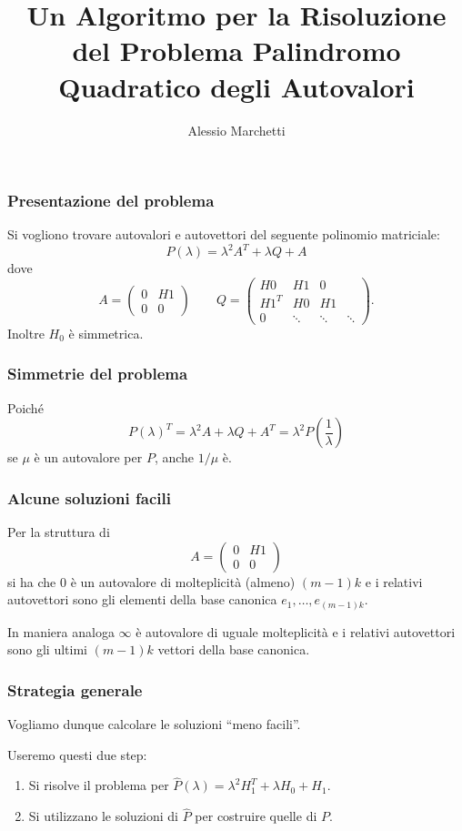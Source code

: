 \documentclass{beamer}
\title[Risoluzione di PQEP]{Un Algoritmo per la Risoluzione del Problema
Palindromo Quadratico degli Autovalori }
\author{Alessio Marchetti}
\date{}
\begin{document}
\frame{\titlepage}

\begin{frame}
\frametitle{Presentazione del problema}
    Si vogliono trovare autovalori e autovettori del seguente polinomio
    matriciale:
    \[
        P(\lambda) = \lambda^2 A^T + \lambda Q + A
    \]
    dove
    \[
        A = 
        \begin{pmatrix}
            0 & H1 \\
            0 & 0
        \end{pmatrix}
        \qquad
        Q = 
        \begin{pmatrix}
            H0 & H1 & 0\\
            H1^T & H0 & H1 \\
            0 & \ddots & \ddots & \ddots 
        \end{pmatrix}.
    \]
    Inoltre $H_0$ \`e simmetrica.
\end{frame}



\begin{frame}
\frametitle{Simmetrie del problema}
    Poich\'e
    \[
        P(\lambda)^T = \lambda^2 A + \lambda Q + A^T = \lambda^2
        P\left(\frac{1}{\lambda}\right)
    \]
    se $\mu$ \`e un autovalore per $P$, anche $1/\mu$ \`e.
\end{frame}


\begin{frame}
\frametitle{Alcune soluzioni facili}
    Per la struttura di
    \[ %
        A = 
        \begin{pmatrix}
            0 & H1 \\
            0 & 0
        \end{pmatrix}
    \]
    si ha che $0$ \`e un autovalore di molteplicit\`a (almeno) $(m-1)k$ e i
    relativi autovettori sono gli elementi della base canonica $e_1, \dots,
    e_{(m-1)k}$.

    In maniera analoga $\infty$ \`e autovalore di uguale molteplicit\`a e i
    relativi autovettori sono gli ultimi $(m-1)k$ vettori della base canonica.
\end{frame}


\begin{frame}
\frametitle{Strategia generale}
    Vogliamo dunque calcolare le soluzioni ``meno facili''.

    Useremo questi due step:
    \begin{enumerate}
        \item Si risolve il problema per $\hat{P}(\lambda) = \lambda^2 H_1^T +
            \lambda H_0 + H_1$.
        \item Si utilizzano le soluzioni di $\hat{P}$ per costruire quelle di
            $P$.
    \end{enumerate}
\end{frame}
\end{document}
